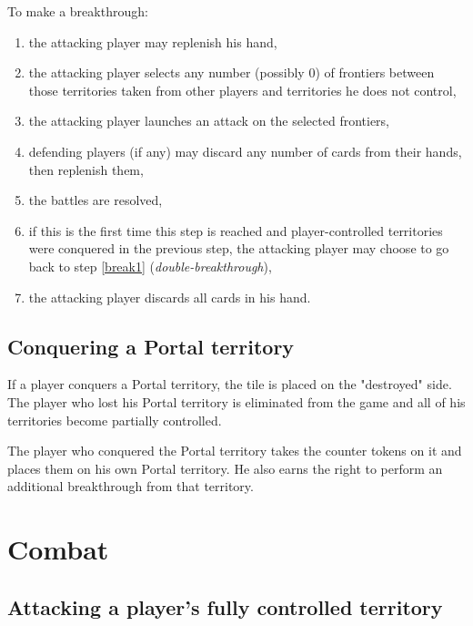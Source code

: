 \documentclass[a4paper]{article}
\begin{document}
    \hspace{-2em} To make a breakthrough:
    \vspace{-1.3em}
    \begin{enumerate}
        \item the attacking player may replenish his hand, \label{break1}
        \item the attacking player selects any number (possibly 0) of frontiers between
        those territories taken from other players and territories he does not control,
        \item the attacking player launches an attack on the selected frontiers,
        \item defending players (if any) may discard any number of cards from their hands,
        then replenish them,
        \item the battles are resolved,
        \item if this is the first time this step is reached and player-controlled
        territories were conquered in the previous step, the attacking player may choose
        to go back to step \ref{break1} (\textit{double-breakthrough}),
        \item the attacking player discards all cards in his hand.
    \end{enumerate}


\subsection{Conquering a Portal territory}

    If a player conquers a Portal territory, the tile is placed on the "destroyed" side.
    The player who lost his Portal territory is eliminated from the game
    and all of his territories become partially controlled.
    
    The player who conquered the Portal territory takes the counter tokens
    on it and places them on his own Portal territory.
    He also earns the right to perform an additional breakthrough from that territory.


\newpage
\section{Combat}

  \subsection{Attacking a player's fully controlled territory}
  
\end{document}
